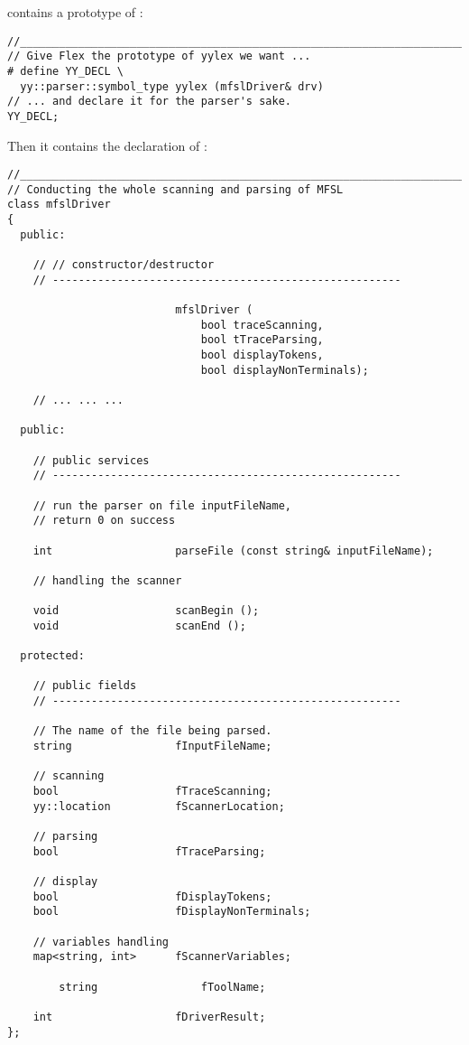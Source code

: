  contains a prototype of :
\begin{lstlisting}[language=Terminal]
//______________________________________________________________________________
// Give Flex the prototype of yylex we want ...
# define YY_DECL \
  yy::parser::symbol_type yylex (mfslDriver& drv)
// ... and declare it for the parser's sake.
YY_DECL;
\end{lstlisting}

Then it contains the declaration of :
\begin{lstlisting}[language=Terminal]
//______________________________________________________________________________
// Conducting the whole scanning and parsing of MFSL
class mfslDriver
{
  public:

    // // constructor/destructor
    // ------------------------------------------------------

                          mfslDriver (
                              bool traceScanning,
                              bool tTraceParsing,
                              bool displayTokens,
                              bool displayNonTerminals);

	// ... ... ...
	
  public:

    // public services
    // ------------------------------------------------------

    // run the parser on file inputFileName,
    // return 0 on success

    int                   parseFile (const string& inputFileName);

    // handling the scanner

    void                  scanBegin ();
    void                  scanEnd ();

  protected:

    // public fields
    // ------------------------------------------------------

    // The name of the file being parsed.
    string                fInputFileName;

    // scanning
    bool                  fTraceScanning;
    yy::location          fScannerLocation;

    // parsing
    bool                  fTraceParsing;

    // display
    bool                  fDisplayTokens;
    bool                  fDisplayNonTerminals;

    // variables handling
    map<string, int>      fScannerVariables;

		string                fToolName;
    
    int                   fDriverResult;
};
\end{lstlisting}

